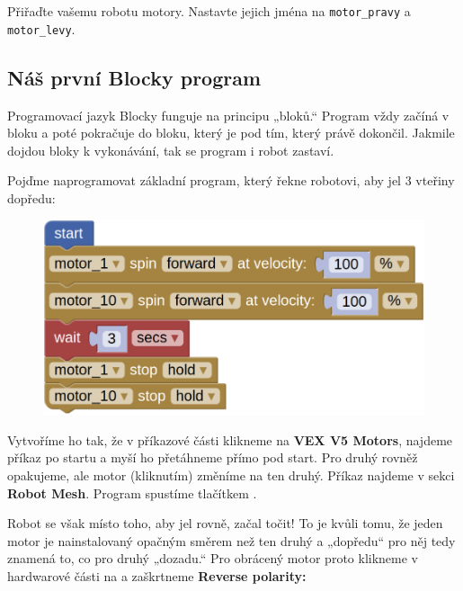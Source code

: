 \documentclass[main.tex]{subfiles}
\begin{document}
	\begin{question}
		Přiřaďte vašemu robotu motory. Nastavte jejich jména na \texttt{motor\_pravy} a \texttt{motor\_levy}.
	\end{question}

	\subsection{Náš první Blocky program}

	Programovací jazyk Blocky funguje na principu „bloků.“ Program vždy začíná v bloku \blockStartImage a poté pokračuje do bloku, který je pod tím, který právě dokončil. Jakmile dojdou bloky k vykonávání, tak se program i robot zastaví.

	Pojďme naprogramovat základní program, který řekne robotovi, aby jel $3$ vteřiny dopředu:

	\begin{figure}[h!]
		\centering
		\begin{minipage}{0.5\textwidth}
			\includegraphics[width=\linewidth]{Images/01/program-1.png}
		\end{minipage}
	\end{figure}

	Vytvoříme ho tak, že v příkazové části klikneme na \textbf{VEX V5 Motors}, najdeme příkaz po startu a myší ho přetáhneme přímo pod start. Pro druhý rovněž opakujeme, ale motor (kliknutím) změníme na ten druhý. Příkaz \blockWaitImage najdeme v sekci \textbf{Robot Mesh}. Program spustíme tlačítkem .

	Robot se však místo toho, aby jel rovně, začal točit! To je kvůli tomu, že jeden motor je nainstalovaný opačným směrem než ten druhý a „dopředu“ pro něj tedy znamená to, co pro druhý „dozadu.“ Pro obrácený motor proto klikneme v hardwarové části na  a zaškrtneme \textbf{Reverse polarity:}
\end{document}
